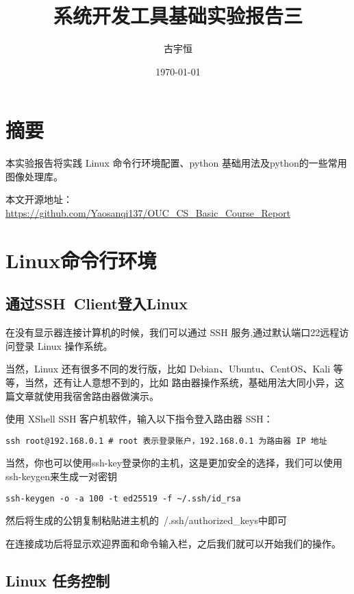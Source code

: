 \documentclass[UTF8]{gyh}
\title{系统开发工具基础实验报告三}
\author{古宇恒}
\date{\today}
\begin{document}
\fancyfoot[C]{\thepage}

\maketitle
\tableofcontents
\newpage

\section{摘要}
本实验报告将实践 Linux 命令行环境配置、python 基础用法及python的一些常用图像处理库。

本文开源地址：\href{https://github.com/Yaosanqi137/OUC_CS_Basic_Course_Report}{https://github.com/Yaosanqi137/OUC\_CS\_Basic\_Course\_Report}

\section{Linux命令行环境}

\subsection{通过SSH\ Client登入Linux}

在没有显示器连接计算机的时候，我们可以通过 SSH 服务,通过默认端口22远程访问登录 Linux 操作系统。

当然，Linux 还有很多不同的发行版，比如 Debian、Ubuntu、CentOS、Kali 等等，当然，还有让人意想不到的，比如  路由器操作系统，基础用法大同小异，这篇文章就使用我宿舍路由器做演示。

使用 XShell SSH 客户机软件，输入以下指令登入路由器 SSH：

\begin{lstlisting}
ssh root@192.168.0.1 # root 表示登录账户，192.168.0.1 为路由器 IP 地址
\end{lstlisting}

当然，你也可以使用ssh-key登录你的主机，这是更加安全的选择，我们可以使用ssh-keygen来生成一对密钥

\begin{lstlisting}
ssh-keygen -o -a 100 -t ed25519 -f ~/.ssh/id_rsa
\end{lstlisting}

然后将生成的公钥复制粘贴进主机的~/.ssh/authorized\_keys中即可

在连接成功后将显示欢迎界面和命令输入栏，之后我们就可以开始我们的操作。

\subsection{Linux 任务控制}
\end{document}
